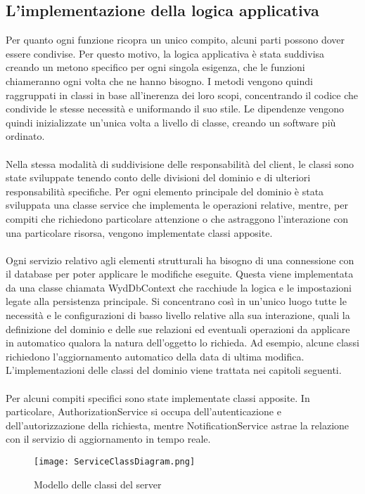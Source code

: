 \subsection{L'implementazione della logica applicativa}
Per quanto ogni funzione ricopra un unico compito, alcuni parti possono dover essere condivise.
Per questo motivo, la logica applicativa è stata suddivisa creando un metono specifico per ogni singola esigenza,
che le funzioni chiameranno ogni volta che ne hanno bisogno.
I metodi vengono quindi raggruppati in classi in base all'inerenza dei loro scopi, 
concentrando il codice che condivide le stesse necessità e uniformando il suo stile.
Le dipendenze vengono quindi inizializzate un'unica volta a livello di classe, creando un software più ordinato.\\
\\
Nella stessa modalità di suddivisione delle responsabilità del client, 
le classi sono state sviluppate tenendo conto delle divisioni del dominio e di ulteriori responsabilità specifiche. 
Per ogni elemento principale del dominio è stata sviluppata una classe service che implementa le operazioni relative,
mentre, per compiti che richiedono particolare attenzione o che astraggono l'interazione con una particolare risorsa, 
vengono implementate classi apposite.\\
\\
Ogni servizio relativo agli elementi strutturali ha bisogno di una connessione con il database per poter applicare le modifiche eseguite.
Questa viene implementata da una classe chiamata WydDbContext che racchiude la logica 
e le impostazioni legate alla persistenza principale.
Si concentrano così in un'unico luogo tutte le necessità e le configurazioni di basso livello relative alla sua interazione,
quali la definizione del dominio e delle sue relazioni ed 
eventuali operazioni da applicare in automatico qualora la natura dell'oggetto lo richieda.
Ad esempio, alcune classi richiedono l'aggiornamento automatico della data di ultima modifica.
L'implementazioni delle classi del dominio viene trattata nei capitoli seguenti.\\
\\
Per alcuni compiti specifici sono state implementate classi apposite.
In particolare, AuthorizationService si occupa dell'autenticazione e dell'autorizzazione della richiesta,
mentre NotificationService astrae la relazione con il servizio di aggiornamento in tempo reale.
\clearpage
\begin{figure}[h!]
    \begin{center}
        \texttt{[image: ServiceClassDiagram.png]}
        \caption{Modello delle classi del server}
    \end{center}
\end{figure}
